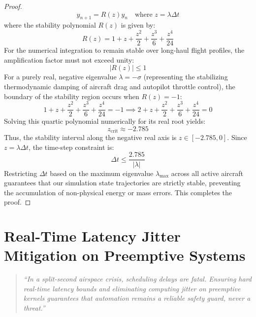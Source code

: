 \documentclass[11pt,a4paper]{book}
\begin{document}
\begin{proof}
\begin{equation}
y_{n+1} = R(z) y_n \quad \text{where } z = \lambda \Delta t
\end{equation}
where the stability polynomial $R(z)$ is given by:
\begin{equation}
\label{eq:stability_polynomial}
R(z) = 1 + z + \frac{z^2}{2} + \frac{z^3}{6} + \frac{z^4}{24}
\end{equation}
For the numerical integration to remain stable over long-haul flight profiles, the amplification factor must not exceed unity:
\begin{equation}
\label{eq:stability_region}
\lvert R(z) \rvert \le 1
\end{equation}
For a purely real, negative eigenvalue $\lambda = -\sigma$ (representing the stabilizing thermodynamic damping of aircraft drag and autopilot throttle control), the boundary of the stability region occurs when $R(z) = -1$:
\begin{equation}
\label{eq:stability_boundary_equation}
1 + z + \frac{z^2}{2} + \frac{z^3}{6} + \frac{z^4}{24} = -1 \implies 2 + z + \frac{z^2}{2} + \frac{z^3}{6} + \frac{z^4}{24} = 0
\end{equation}
Solving this quartic polynomial numerically for its real root yields:
\begin{equation}
\label{eq:stability_root}
z_{\text{crit}} \approx -2.785
\end{equation}
Thus, the stability interval along the negative real axis is $z \in [-2.785, 0]$. Since $z = \lambda \Delta t$, the time-step constraint is:
\begin{equation}
\label{eq:final_stability_bound}
\Delta t \le \frac{2.785}{\lvert \lambda \rvert}
\end{equation}
Restricting $\Delta t$ based on the maximum eigenvalue $\lambda_{\max}$ across all active aircraft guarantees that our simulation state trajectories are strictly stable, preventing the accumulation of non-physical energy or mass errors. This completes the proof.
\end{proof}

\section{Real-Time Latency Jitter Mitigation on Preemptive Systems}\label{sec:real_time_latency}
\begin{quote}
    \textit{``In a split-second airspace crisis, scheduling delays are fatal. Ensuring hard real-time latency bounds and eliminating computing jitter on preemptive kernels guarantees that automation remains a reliable safety guard, never a threat.''}
\end{quote}
\end{document}
